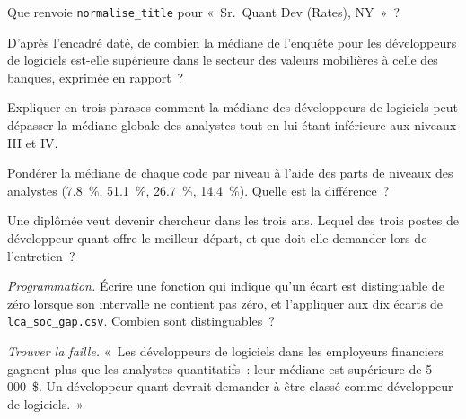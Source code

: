 \begin{exercise}[$\star$]\label{exo:in:quant-developer:2}
Que renvoie \texttt{normalise\_title} pour «~Sr.\ Quant Dev (Rates), NY~»~?
\end{exercise}

\begin{exercise}[$\star$]\label{exo:in:quant-developer:3}
D'après l'encadré daté, de combien la médiane de l'enquête pour les développeurs de logiciels est-elle supérieure dans le secteur des valeurs mobilières
à celle des banques, exprimée en rapport~?
\end{exercise}

\begin{exercise}[$\star\star$]\label{exo:in:quant-developer:4}
Expliquer en trois phrases comment la médiane des développeurs de logiciels peut dépasser la médiane globale des analystes
tout en lui étant inférieure aux niveaux III et IV.
\end{exercise}

\begin{exercise}[$\star\star$]\label{exo:in:quant-developer:5}
Pondérer la médiane de chaque code par niveau à l'aide des parts de niveaux des analystes (7.8~\%, 51.1~\%, 26.7~\%, 14.4~\%). Quelle est
la différence~?
\end{exercise}

\begin{exercise}[$\star\star$]\label{exo:in:quant-developer:6}
Une diplômée veut devenir chercheur dans les trois ans. Lequel des trois postes de développeur quant offre le meilleur
départ, et que doit-elle demander lors de l'entretien~?
\end{exercise}

\begin{exercise}[$\star\star\star$]\label{exo:in:quant-developer:7}
\emph{Programmation.} Écrire une fonction qui indique qu'un écart est distinguable de zéro lorsque son intervalle ne contient pas zéro, et
l'appliquer aux dix écarts de \texttt{lca\_soc\_gap.csv}. Combien sont distinguables~?
\end{exercise}

\begin{exercise}[$\star\star\star$]\label{exo:in:quant-developer:8}
\emph{Trouver la faille.} «~Les développeurs de logiciels dans les employeurs financiers gagnent plus que les analystes quantitatifs~: leur médiane est
supérieure de 5\,000~\$. Un développeur quant devrait demander à être classé comme développeur de logiciels.~»
\end{exercise}

